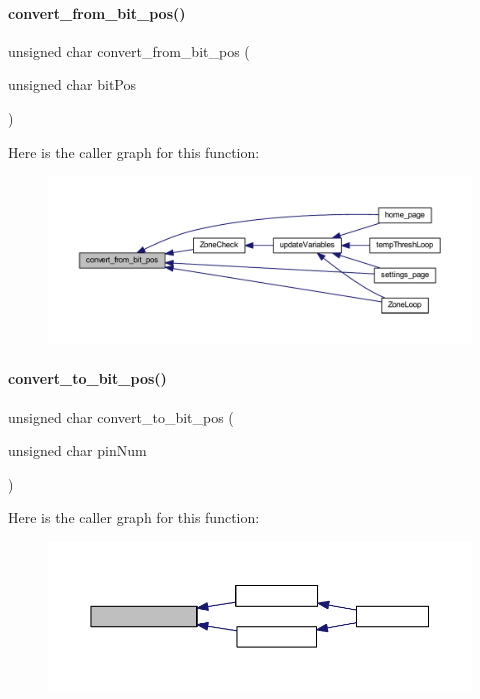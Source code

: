 \paragraph{convert\+\_\+from\+\_\+bit\+\_\+pos()}
{\footnotesize\ttfamily unsigned char convert\+\_\+from\+\_\+bit\+\_\+pos (\begin{DoxyParamCaption}\item[{unsigned char}]{bit\+Pos }\end{DoxyParamCaption})}

Here is the caller graph for this function\+:
\nopagebreak
\begin{figure}[H]
\begin{center}
\leavevmode
\includegraphics[width=350pt]{a00020_a0975bad4a272465d34f2dd42b61929f9_icgraph}
\end{center}
\end{figure}
\mbox{\label{a00020_ac22561642e81efb7df183503c322c2b0}} 
\paragraph{convert\+\_\+to\+\_\+bit\+\_\+pos()}
{\footnotesize\ttfamily unsigned char convert\+\_\+to\+\_\+bit\+\_\+pos (\begin{DoxyParamCaption}\item[{unsigned char}]{pin\+Num }\end{DoxyParamCaption})}

Here is the caller graph for this function\+:
\nopagebreak
\begin{figure}[H]
\begin{center}
\leavevmode
\includegraphics[width=350pt]{a00020_ac22561642e81efb7df183503c322c2b0_icgraph}
\end{center}
\end{figure}
\mbox{\label{a00020_abbe3f18b8a8d4112e5d5f3d1764ccabf}} 
